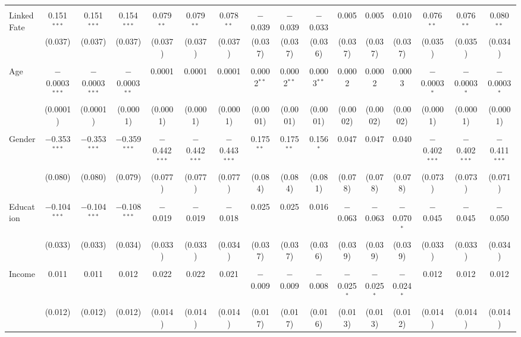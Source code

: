 \begin{table}[!htbp]
\begin{tabular}{@{\extracolsep{5pt}}lccccccccccccccc}
  & & & & & & & & & & & & & & & \\ 
 Linked Fate & 0.151$^{***}$ & 0.151$^{***}$ & 0.154$^{***}$ & 0.079$^{**}$ & 0.079$^{**}$ & 0.078$^{**}$ & $-$0.039 & $-$0.039 & $-$0.033 & 0.005 & 0.005 & 0.010 & 0.076$^{**}$ & 0.076$^{**}$ & 0.080$^{**}$ \\ 
  & (0.037) & (0.037) & (0.037) & (0.037) & (0.037) & (0.037) & (0.037) & (0.037) & (0.036) & (0.037) & (0.037) & (0.037) & (0.035) & (0.035) & (0.034) \\ 
  & & & & & & & & & & & & & & & \\ 
 Age & $-$0.0003$^{***}$ & $-$0.0003$^{***}$ & $-$0.0003$^{**}$ & 0.0001 & 0.0001 & 0.0001 & 0.0002$^{**}$ & 0.0002$^{**}$ & 0.0003$^{**}$ & 0.0002 & 0.0002 & 0.0003 & $-$0.0003$^{*}$ & $-$0.0003$^{*}$ & $-$0.0003$^{*}$ \\ 
  & (0.0001) & (0.0001) & (0.0001) & (0.0001) & (0.0001) & (0.0001) & (0.0001) & (0.0001) & (0.0001) & (0.0002) & (0.0002) & (0.0002) & (0.0001) & (0.0001) & (0.0001) \\ 
  & & & & & & & & & & & & & & & \\ 
 Gender & $-$0.353$^{***}$ & $-$0.353$^{***}$ & $-$0.359$^{***}$ & $-$0.442$^{***}$ & $-$0.442$^{***}$ & $-$0.443$^{***}$ & 0.175$^{**}$ & 0.175$^{**}$ & 0.156$^{*}$ & 0.047 & 0.047 & 0.040 & $-$0.402$^{***}$ & $-$0.402$^{***}$ & $-$0.411$^{***}$ \\ 
  & (0.080) & (0.080) & (0.079) & (0.077) & (0.077) & (0.077) & (0.084) & (0.084) & (0.081) & (0.078) & (0.078) & (0.078) & (0.073) & (0.073) & (0.071) \\ 
  & & & & & & & & & & & & & & & \\ 
 Education & $-$0.104$^{***}$ & $-$0.104$^{***}$ & $-$0.108$^{***}$ & $-$0.019 & $-$0.019 & $-$0.018 & 0.025 & 0.025 & 0.016 & $-$0.063 & $-$0.063 & $-$0.070$^{*}$ & $-$0.045 & $-$0.045 & $-$0.050 \\ 
  & (0.033) & (0.033) & (0.034) & (0.033) & (0.033) & (0.034) & (0.037) & (0.037) & (0.036) & (0.039) & (0.039) & (0.039) & (0.033) & (0.033) & (0.034) \\ 
  & & & & & & & & & & & & & & & \\ 
 Income & 0.011 & 0.011 & 0.012 & 0.022 & 0.022 & 0.021 & $-$0.009 & $-$0.009 & $-$0.008 & $-$0.025$^{*}$ & $-$0.025$^{*}$ & $-$0.024$^{*}$ & 0.012 & 0.012 & 0.012 \\ 
  & (0.012) & (0.012) & (0.012) & (0.014) & (0.014) & (0.014) & (0.017) & (0.017) & (0.016) & (0.013) & (0.013) & (0.012) & (0.014) & (0.014) & (0.014) \\ 

\end{tabular}
\end{table}
